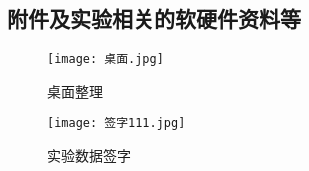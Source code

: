 \documentclass[dvipsnames, svgnames,a4paper,11pt]{article}
\begin{document}
	

	\subsection{附件及实验相关的软硬件资料等}
	\begin{figure}[H]
		\centering
		\begin{minipage}{0.45\textwidth}
			\centering
			\texttt{[image: 桌面.jpg]} %
			\caption{桌面整理}
			\label{fig:desktop}
		\end{minipage}\hfill
		\begin{minipage}{0.45\textwidth}
			\centering
			\texttt{[image: 签字111.jpg]} %
			\caption{实验数据签字}
			\label{fig:signature}
		\end{minipage}
	\end{figure}
	
	
\end{document}

